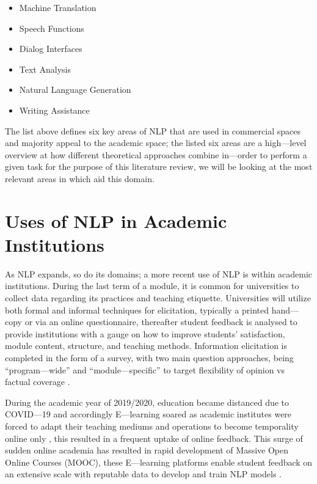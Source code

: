 \begin{itemize}
    \item Machine Translation
    \item Speech Functions
    \item Dialog Interfaces
    \item Text Analysis
    \item Natural Language Generation
    \item Writing Assistance
\end{itemize}

The list above defines six key areas of NLP that are used in commercial spaces and majority appeal to the academic space; the listed six areas are a high---level overview at how different theoretical approaches combine in---order to perform a given task \parencite{dale2019nlp} for the purpose of this literature review, we will be looking at the most relevant areas in which aid this domain.

\section{Uses of NLP in Academic Institutions}

As NLP expands, so do its domains; a more recent use of NLP is within academic institutions. During the last term of a module, it is common for universities to collect data regarding its practices and teaching etiquette. Universities will utilize both formal and informal techniques for elicitation, typically a printed hand---copy or via an online questionnaire, thereafter student feedback is analysed to provide institutions with a gauge on how to improve students’ satisfaction, module content, structure, and teaching methods. Information elicitation is completed in the form of a survey, with two main question approaches, being “program---wide” and “module---specific” to target flexibility of opinion vs factual coverage \parencite{keane2005obtaining, beran2007s}.

During the academic year of 2019/2020, education became distanced due to COVID---19 and accordingly E---learning soared as academic institutes were forced to adapt their teaching mediums and operations to become temporality online only \parencite{burgess2020schools}, this resulted in a frequent uptake of online feedback. This surge of sudden online academia has resulted in rapid development of Massive Open Online Courses (MOOC), these E---learning platforms enable student feedback on an extensive scale with reputable data to develop and train NLP models \parencite{wang2021predicting}.

